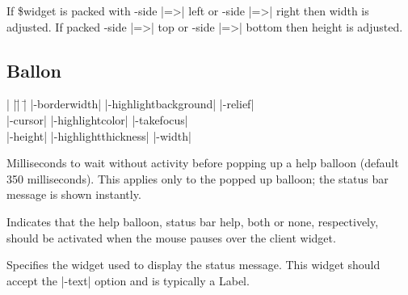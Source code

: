\vskip5pt

\begin{enum}{1cm}

If \$widget is packed with -side |=>| left or -side |=>| right then width is adjusted.
If packed -side |=>| top or -side |=>| bottom then height is adjusted. 

\end{enum}

\subsection*{Ballon}
\vspace{-4pt}

\begin{tabbing}
|                   |\=|                     |\= \kill
|-borderwidth| \> |-highlightbackground|     \> |-relief| \\   
|-cursor|      \> |-highlightcolor|          \> |-takefocus| \\
|-height|      \> |-highlightthickness|      \> |-width| \\
\end{tabbing}

\vskip5pt

\begin{enum}{1cm}

Milliseconds to wait without activity before popping up a help balloon
(default 350 milliseconds). This applies only to the popped up
balloon; the status bar message is shown instantly. 

Indicates that the help balloon, status bar help, both or none, respectively,
 should be activated when the mouse pauses over the client widget. 

Specifies the widget used to display the status message. This widget should accept the
|-text| option and is typically a Label. 

\end{enum}

\vskip5pt

